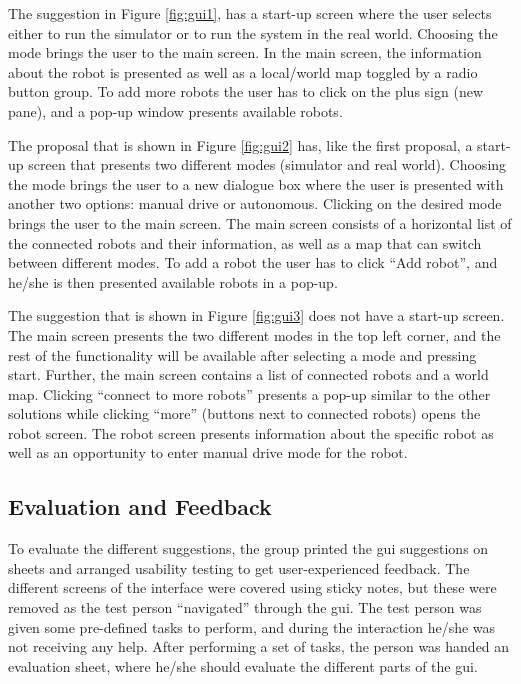The suggestion in Figure \ref{fig:gui1}, has a start-up screen where the user selects either to run the simulator or to run the system in the real world. Choosing the mode brings the user to the main screen. In the main screen, the information about the robot is presented as well as a local/world map toggled by a radio button group. To add more robots the user has to click on the plus sign (new pane), and a pop-up window presents available robots.

The proposal that is shown in Figure \ref{fig:gui2} has, like the first proposal, a start-up screen that presents two different modes (simulator and real world). Choosing the mode brings the user to a new dialogue box where the user is presented with another two options: manual drive or autonomous. Clicking on the desired mode brings the user to the main screen. The main screen consists of a horizontal list of the connected robots and their information, as well as a map that can switch between different modes. To add a robot the user has to click ``Add robot'', and he/she is then presented available robots in a pop-up.

The suggestion that is shown in Figure \ref{fig:gui3} does not have a start-up screen. The main screen presents the two different modes in the top left corner, and the rest of the functionality will be available after selecting a mode and pressing start. Further, the main screen contains a list of connected robots and a world map. Clicking ``connect to more robots'' presents a pop-up similar to the other solutions while clicking ``more'' (buttons next to connected robots) opens the robot screen. The robot screen presents information about the specific robot as well as an opportunity to enter manual drive mode for the robot.

\subsection{Evaluation and Feedback}
\label{sec:evalandfeedback}
To evaluate the different suggestions, the group printed the \acrshort{gui} suggestions on sheets and arranged usability testing to get user-experienced feedback. The different screens of the interface were covered using sticky notes, but these were removed as the test person ``navigated'' through the \acrshort{gui}. The test person was given some pre-defined tasks to perform, and during the interaction he/she was not receiving any help. After performing a set of tasks, the person was handed an evaluation sheet, where he/she should evaluate the different parts of the \acrshort{gui}.

